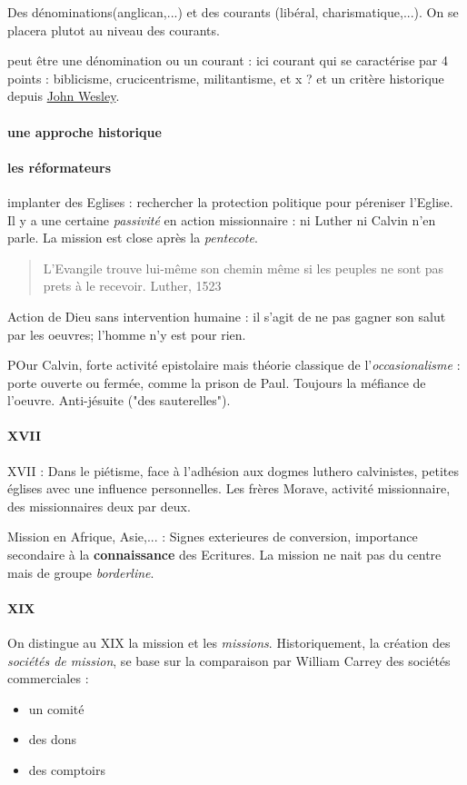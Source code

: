 Des dénominations(anglican,...) et des courants (libéral, charismatique,...). On se placera plutot au niveau des courants.  

\begin{Def}[Evangélique]
peut être une dénomination ou un courant : ici courant qui se caractérise par 4 points : biblicisme, crucicentrisme, militantisme, et x ?
et un critère historique depuis \href{https://fr.wikipedia.org/wiki/John_Wesley}{John Wesley}.
\end{Def}

\paragraph{une approche historique}

\paragraph{les réformateurs} implanter des Eglises : rechercher la protection politique pour péreniser l'Eglise. Il y a une certaine \textit{passivité} en action missionnaire : ni Luther ni Calvin n'en parle. La mission est close après la \textit{pentecote}.
\begin{quote}
    L'Evangile trouve lui-même son chemin même si les peuples ne sont pas prets à le recevoir. Luther, 1523
\end{quote}
Action de Dieu sans intervention humaine : il s'agit de ne pas gagner son salut par les oeuvres; l'homme n'y est pour rien.

POur Calvin, forte activité epistolaire mais théorie classique de l'\textit{occasionalisme} : porte ouverte ou fermée, comme la prison de Paul. Toujours la méfiance de l'oeuvre. Anti-jésuite ("des sauterelles").

\paragraph{XVII}
XVII : Dans le piétisme, face à l'adhésion aux dogmes luthero calvinistes, petites églises avec une influence personnelles.
Les frères Morave, activité missionnaire, des missionnaires deux par deux.

Mission en Afrique, Asie,... : Signes exterieures de conversion, importance secondaire à la \textbf{connaissance} des Ecritures. La mission ne nait pas du centre mais de groupe \textit{borderline}. 

\paragraph{XIX}
On distingue au XIX la mission et les \textit{missions}. Historiquement, la création des \textit{sociétés de mission}, se base sur la comparaison par William Carrey des sociétés commerciales : 
\begin{itemize}
    \item un comité
    \item des dons
    \item des comptoirs
\end{itemize}
